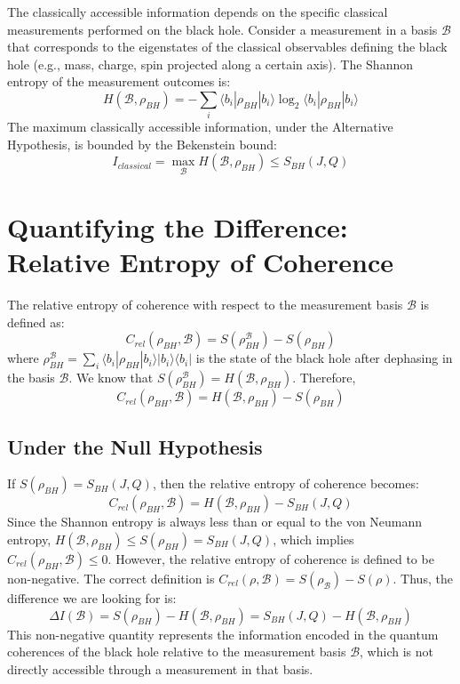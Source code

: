 	The classically accessible information depends on the specific classical measurements performed on the black hole. Consider a measurement in a basis $\mathcal{B}$ that corresponds to the eigenstates of the classical observables defining the black hole (e.g., mass, charge, spin projected along a certain axis). The Shannon entropy of the measurement outcomes is:
	$$H(\mathcal{B}, \rho_{BH}) = -\sum_i \langle b_i|\rho_{BH}|b_i\rangle \log_2 \langle b_i|\rho_{BH}|b_i\rangle$$
	The maximum classically accessible information, under the Alternative Hypothesis, is bounded by the Bekenstein bound:
	$$I_{classical} = \max_{\mathcal{B}} H(\mathcal{B}, \rho_{BH}) \le S_{BH}(J, Q)$$
	
	\section{Quantifying the Difference: Relative Entropy of Coherence}
	
	The relative entropy of coherence with respect to the measurement basis $\mathcal{B}$ is defined as:
	$$C_{rel}(\rho_{BH}, \mathcal{B}) = S(\rho_{BH}^{\mathcal{B}}) - S(\rho_{BH})$$
	where $\rho_{BH}^{\mathcal{B}} = \sum_i \langle b_i|\rho_{BH}|b_i\rangle |b_i\rangle\langle b_i|$ is the state of the black hole after dephasing in the basis $\mathcal{B}$. We know that $S(\rho_{BH}^{\mathcal{B}}) = H(\mathcal{B}, \rho_{BH})$. Therefore,
	$$C_{rel}(\rho_{BH}, \mathcal{B}) = H(\mathcal{B}, \rho_{BH}) - S(\rho_{BH})$$
	
	\subsection{Under the Null Hypothesis}
	If $S(\rho_{BH}) = S_{BH}(J, Q)$, then the relative entropy of coherence becomes:
	$$C_{rel}(\rho_{BH}, \mathcal{B}) = H(\mathcal{B}, \rho_{BH}) - S_{BH}(J, Q)$$
	Since the Shannon entropy is always less than or equal to the von Neumann entropy, $H(\mathcal{B}, \rho_{BH}) \le S(\rho_{BH}) = S_{BH}(J, Q)$, which implies $C_{rel}(\rho_{BH}, \mathcal{B}) \le 0$. However, the relative entropy of coherence is defined to be non-negative. The correct definition is $C_{rel}(\rho, \mathcal{B}) = S(\rho_{\mathcal{B}}) - S(\rho)$. Thus, the difference we are looking for is:
	$$\Delta I(\mathcal{B}) = S(\rho_{BH}) - H(\mathcal{B}, \rho_{BH}) = S_{BH}(J, Q) - H(\mathcal{B}, \rho_{BH})$$
	This non-negative quantity represents the information encoded in the quantum coherences of the black hole relative to the measurement basis $\mathcal{B}$, which is not directly accessible through a measurement in that basis.
	
